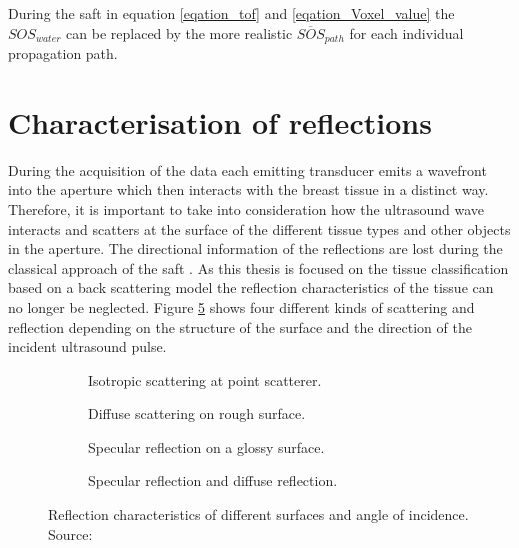 During the \ac{saft} in equation \ref{eqation_tof} and \ref{eqation_Voxel_value} the  $SOS_{water}$ can be replaced by the more realistic $\overline{SOS}_{path}$ for each individual propagation path.







\section{Characterisation of reflections}
\label{sig:flect_character}

During the acquisition of the data each emitting transducer emits a wavefront into the aperture which then interacts with the breast tissue in a distinct way. Therefore, it is important to take into consideration how the ultrasound wave interacts and scatters at the surface of the different tissue types and other objects in the aperture. The directional information of the reflections are lost during the classical approach of the \ac{saft} \cite{Kretzek2015EvaluationTomography}. As this thesis is focused on the tissue classification based on a back scattering model the reflection characteristics of the tissue can no longer be neglected. Figure \ref{fig:types_of_reflect} shows four different kinds of scattering and reflection depending on the structure of the surface and the direction of the incident ultrasound pulse.

\begin{figure}[H]
     \centering
     \begin{subfigure}[b]{0.23\textwidth}
         \centering
         \caption{Isotropic scattering at point scatterer.}
         \label{fig:reflect_isotropic}
     \end{subfigure}
     \hfill
     \begin{subfigure}[b]{0.23\textwidth}
         \centering
         \caption{Diffuse scattering on rough surface.}
         \label{fig:reflect_diffuse}
     \end{subfigure}
     \hfill
     \begin{subfigure}[b]{0.23\textwidth}
         \centering
         \caption{Specular reflection on a glossy surface.}
         \label{fig:reflect_specular}
     \end{subfigure}
     \hfill
     \begin{subfigure}[b]{0.23\textwidth}
         \centering
         \caption{Specular reflection and diffuse reflection.}
         \label{fig:reflect_mixed}
     \end{subfigure}
        \caption{Reflection characteristics of different surfaces and angle of incidence. Source: \cite{Kretzek2015EvaluationTomography}}
        \label{fig:types_of_reflect}
\end{figure}


